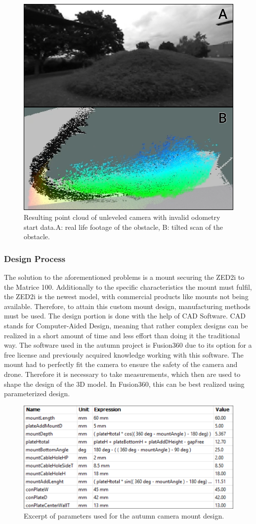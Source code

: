 \begin{figure}[h]
	\centering
	\includegraphics[width=0.5\linewidth]{img/MisalignedOdom}
	\caption{Resulting point cloud of unleveled camera with invalid odometry start data.\newline A: real life footage of the obstacle, B: tilted scan of the obstacle.}
	\label{fig:custom_parts_misalignedOdom}
\end{figure}

\subsubsection{Design Process}

The solution to the aforementioned problems is a mount securing the ZED2i to the Matrice 100. Additionally to the specific characteristics the mount must fulfil, the ZED2i is the newest model, with commercial products like mounts not being available. Therefore, to attain this custom mount design, manufacturing methods must be used. 
The design portion is done with the help of CAD Software. CAD stands for Computer-Aided Design, meaning that rather complex designs can be realized in a short amount of time and less effort than doing it the traditional way. The software used in the autumn project is Fusion360 due to its option for a free license and previously acquired knowledge working with this software. 
The mount had to perfectly fit the camera to ensure the safety of the camera and drone. Therefore it is necessary to take measurements, which then are used to shape the design of the 3D model. In Fusion360, this can be best realized using parameterized design.

\begin{figure}[h]
	\centering
	\includegraphics[width=0.7\linewidth]{img/Parameter}
	\caption{Excerpt of parameters used for the autumn camera mount design.}
	\label{fig:custom_parts_parameter}
\end{figure}

